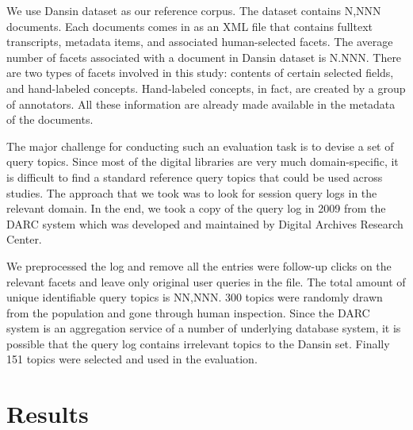 
We use Dansin dataset as our reference corpus.  The dataset contains N,NNN
documents.  Each documents comes in as an XML file that contains fulltext
transcripts, metadata items, and associated human-selected facets.  The average
number of facets associated with a document in Dansin dataset is N.NNN.  There
are two types of facets involved in this study: contents of certain selected
fields, and hand-labeled concepts.  Hand-labeled concepts, in fact, are created
by a group of annotators.  All these information are already made available in
the metadata of the documents.

The major challenge for conducting such an evaluation task is to devise a set
of query topics.  Since most of the digital libraries are very much
domain-specific, it is difficult to find a standard reference query topics that
could be used across studies.  The approach that we took was to look for
session query logs in the relevant domain.  In the end, we took a copy of the
query log in 2009 from the DARC system which was developed and maintained by
Digital Archives Research Center.  

We preprocessed the log and remove all the entries were follow-up clicks on the
relevant facets and leave only original user queries in the file.  The total
amount of unique identifiable query topics is NN,NNN.  300 topics were randomly
drawn from the population and gone through human inspection.  Since the DARC
system is an aggregation service of a number of underlying database system, it
is possible that the query log contains irrelevant topics to the Dansin set.
Finally 151 topics were selected and used in the evaluation.


\section{Results}


